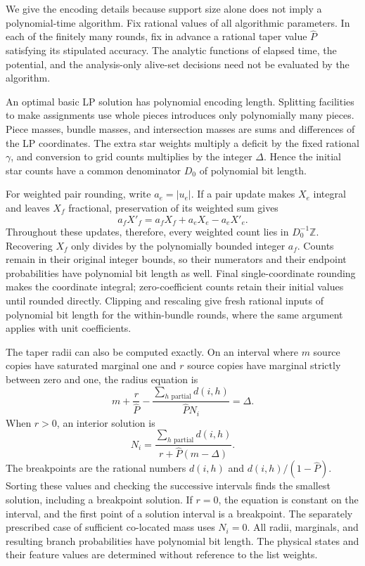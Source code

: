 We give the encoding details because support size alone does not imply
a polynomial-time algorithm. Fix rational values of all algorithmic
parameters. In each of the finitely many rounds, fix in advance a
rational taper value \(\widehat P\) satisfying its stipulated
accuracy. The analytic functions of elapsed time, the potential, and
the analysis-only alive-set decisions need not be evaluated by
the algorithm.

An optimal basic LP solution has polynomial encoding length. Splitting
facilities to make assignments use whole pieces introduces only
polynomially many pieces. Piece masses, bundle masses, and
intersection masses are sums and differences of the LP coordinates.
The extra star weights multiply a deficit by the fixed rational
\(\gamma\), and conversion to grid counts multiplies by the integer
\(\Delta\). Hence the initial star counts have a common denominator
\(D_0\) of polynomial bit length.

For weighted pair rounding, write \(a_e=|u_e|\). If a pair update
makes \(X_e\) integral and leaves \(X_f\) fractional, preservation
of its weighted sum gives
\[
 a_fX'_f=a_fX_f+a_eX_e-a_eX'_e.
\]
Throughout these updates, therefore, every weighted count lies in
\(D_0^{-1}\mathbb Z\). Recovering \(X_f\) only divides by the
polynomially bounded integer \(a_f\). Counts remain in their original
integer bounds, so their numerators and their endpoint probabilities
have polynomial bit length as well. Final single-coordinate rounding
makes the coordinate integral; zero-coefficient counts retain their
initial values until rounded directly. Clipping and rescaling give
fresh rational inputs of polynomial bit length for the within-bundle
rounds, where the same argument applies with unit coefficients.

The taper radii can also be computed exactly. On an interval where
\(m\) source copies have saturated marginal one and \(r\) source
copies have marginal strictly between zero and one, the radius
equation is
\[
 m+\frac{r}{\widehat P}
 -\frac{\sum_{h\text{ partial}}d(i,h)}{\widehat P N_i}
 =\Delta.
\]
When \(r>0\), an interior solution is
\begin{equation}
 N_i=
 \frac{\sum_{h\text{ partial}}d(i,h)}
      {r+\widehat P(m-\Delta)}.
 \label{eq:rational-taper-radius}
\end{equation}
The breakpoints are the rational numbers \(d(i,h)\) and
\(d(i,h)/(1-\widehat P)\). Sorting these values and checking the
successive intervals finds the smallest solution, including a
breakpoint solution. If \(r=0\), the equation is constant on the
interval, and the first point of a solution interval is a breakpoint.
The separately prescribed case of sufficient
co-located mass uses \(N_i=0\). All radii, marginals, and resulting
branch probabilities have polynomial bit length. The physical states
and their feature values are determined without reference to the
list weights.

